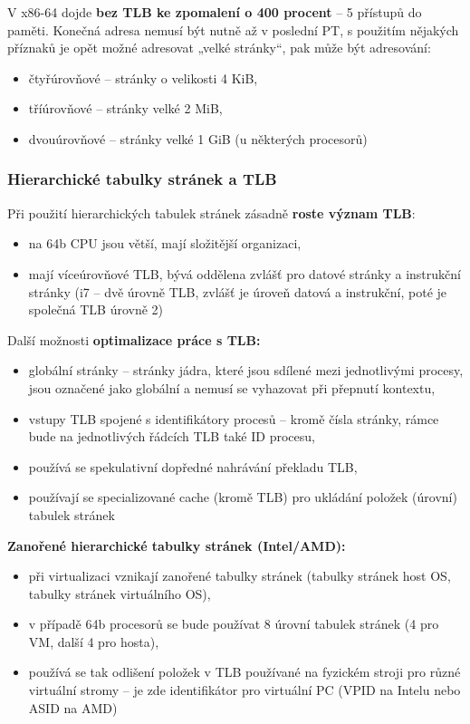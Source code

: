 \documentclass[a4paper, 11pt]{article}
\begin{document}
V x86-64 dojde \textbf{bez TLB ke zpomalení o 400 procent} -- 5 přístupů do paměti. Konečná adresa nemusí být nutně až v poslední PT, s použitím nějakých příznaků je opět možné adresovat „velké stránky“, pak může být adresování:
\begin{itemize}
    \item čtyřúrovňové -- stránky o velikosti 4 KiB,
    \item tříúrovňové -- stránky velké 2 MiB,
    \item dvouúrovňové -- stránky velké 1 GiB (u některých procesorů)
\end{itemize}
 
\subsubsection{Hierarchické tabulky stránek a TLB}
Při použití hierarchických tabulek stránek zásadně \textbf{roste význam TLB}:

\begin{itemize}
    \item na 64b CPU jsou větší, mají složitější organizaci,
    \item mají víceúrovňové TLB, bývá oddělena zvlášť pro datové stránky a instrukční stránky (i7 -- dvě úrovně TLB, zvlášť je úroveň datová a instrukční, poté je společná TLB úrovně 2)
\end{itemize}

\newpage
Další možnosti \textbf{optimalizace práce s TLB:}
\begin{itemize}
    \item globální stránky -- stránky jádra, které jsou sdílené mezi jednotlivými procesy, jsou označené jako globální a nemusí se vyhazovat při přepnutí kontextu,
    \item vstupy TLB spojené s identifikátory procesů -- kromě čísla stránky, rámce bude na jednotlivých řádcích TLB také ID procesu,
    \item používá se spekulativní dopředné nahrávání překladu TLB,
    \item používají se specializované cache (kromě TLB) pro ukládání položek (úrovní) tabulek stránek
\end{itemize}
 
\textbf{Zanořené hierarchické tabulky stránek (Intel/AMD):}
\begin{itemize}
    \item při virtualizaci vznikají zanořené tabulky stránek (tabulky stránek host OS, tabulky stránek virtuálního OS),
    \item v případě 64b procesorů se bude používat 8 úrovní tabulek stránek (4 pro VM, další 4 pro hosta),
    \item používá se tak odlišení položek v TLB používané na fyzickém stroji pro různé virtuální stromy -- je zde identifikátor pro virtuální PC (VPID na Intelu nebo ASID na AMD)
\end{itemize}
 
\end{document}
